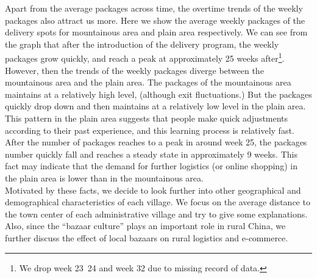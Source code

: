 \documentclass{article}
\begin{document}
Apart from the average packages across time, the overtime trends of the weekly packages also attract us more. Here we show the average weekly packages of the delivery spots for mountainous area and plain area respectively. We can see from the graph that after the introduction of the delivery program, the weekly packages grow quickly, and reach a peak at approximately 25 weeks after\footnote{We drop week 23~24 and week 32 due to missing record of data.}. However, then the trends of the weekly packages diverge between the mountainous area and the plain area. The packages of the mountainous area maintains at a relatively high level, (although exit fluctuations.) But the packages quickly drop down and then maintains at a relatively low level in the plain area. This pattern in the plain area suggests that people make quick adjustments according to their past experience, and this learning process is relatively fast. After the number of packages reaches to a peak in around week 25, the packages number quickly fall and reaches a steady state in approximately 9 weeks. This fact may indicate that the demand for further logistics (or online shopping) in the plain area is lower than in the mountainous area.\\
\mbox{\hspace{2em}}
Motivated by these facts, we decide to look further into other geographical and demographical characteristics of each village. We focus on the average distance to the town center of each administrative village and try to give some explanations. Also, since the “bazaar culture” plays an important role in rural China, we further discuss the effect of local bazaars on rural logistics and e-commerce.\\
\end{document}

